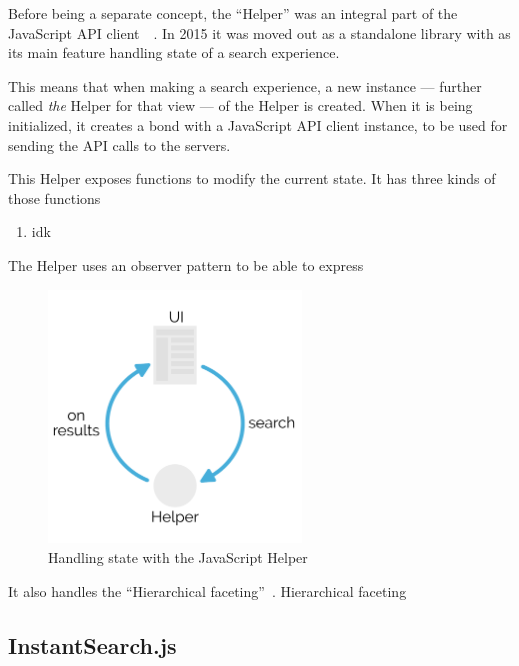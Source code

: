 Before being a separate concept, the ``Helper'' was an integral part of the JavaScript API client~\cite{algolia-blog-js-client}~. In 2015 it was moved out as a standalone library with as its main feature handling state of a search experience.

This means that when making a search experience, a new instance --- further called \emph{the} Helper for that view --- of the Helper is created. When it is being initialized, it creates a bond with a JavaScript API client instance, to be used for sending the API calls to the servers.

This Helper exposes functions to modify the current state. It has three kinds of those functions


\begin{enumerate}
  \item idk %
\end{enumerate}

The Helper uses an observer pattern to be able to express


\begin{figure}[H]
\label{figure:js-helper-state}
  \centering
  \includegraphics[width=0.6\textwidth]{../assets/helper-cycle.pdf}
  \caption{Handling state with the JavaScript Helper\cite{js-helper-concepts}}
\end{figure}

It also handles the ``Hierarchical faceting''\cite{hierarchical-faceting}~. Hierarchical faceting %


\subsection{InstantSearch.js} %
\label{sub:instantsearch_js}

